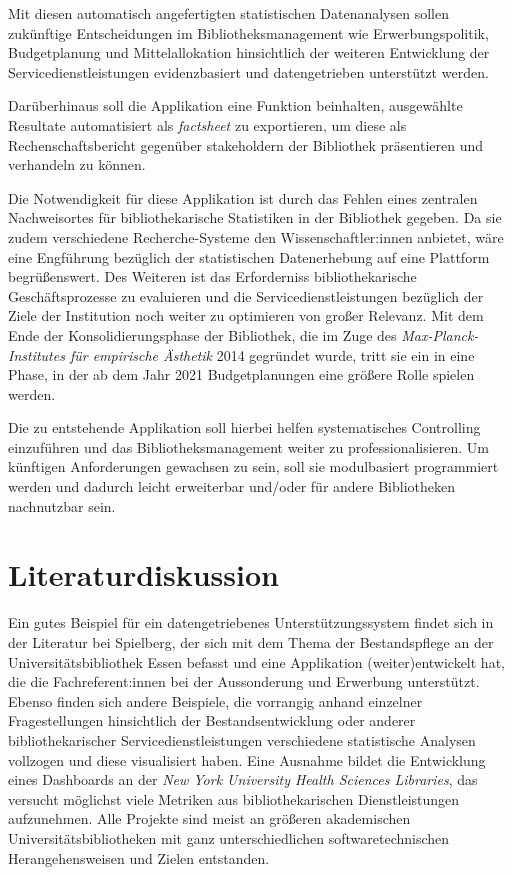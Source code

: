\documentclass[10pt,a4paper,twocolumn,conference]{IEEEtran}
\begin{document}
Mit diesen automatisch angefertigten statistischen Datenanalysen sollen zukünftige
Entscheidungen im Bibliotheksmanagement wie Erwerbungspolitik, Budgetplanung und 
Mittelallokation hinsichtlich der weiteren Entwicklung der 
Servicedienstleistungen evidenzbasiert und datengetrieben unterstützt werden.

Darüberhinaus soll die Applikation  eine Funktion beinhalten, ausgewählte
Resultate automatisiert als \textit{factsheet} zu exportieren, um diese 
als Rechenschaftsbericht gegenüber stakeholdern der Bibliothek präsentieren und
verhandeln zu können.

Die Notwendigkeit für diese Applikation ist durch das
Fehlen eines zentralen Nachweisortes für bibliothekarische
Statistiken in der Bibliothek gegeben. Da sie zudem verschiedene Recherche-Systeme den
Wissenschaftler:innen anbietet, wäre eine Engführung bezüglich der statistischen
Datenerhebung auf eine Plattform begrüßenswert.
Des Weiteren ist das Erforderniss bibliothekarische Geschäftsprozesse zu evaluieren und die
Servicedienstleistungen bezüglich der Ziele der Institution noch weiter zu
optimieren von großer Relevanz. Mit dem Ende der Konsolidierungsphase der
Bibliothek, die im Zuge des \textit{Max-Planck-Institutes für empirische
Ästhetik} 2014 gegründet wurde, tritt sie ein in eine Phase, in der ab dem Jahr
2021 Budgetplanungen eine größere Rolle spielen werden. 

Die zu entstehende Applikation soll hierbei helfen systematisches Controlling einzuführen und das
Bibliotheksmanagement weiter zu professionalisieren.
Um künftigen Anforderungen gewachsen zu sein, soll sie 
modulbasiert programmiert werden und dadurch leicht erweiterbar und/oder für 
andere Bibliotheken nachnutzbar sein.


\section{Literaturdiskussion}
Ein gutes Beispiel für ein datengetriebenes Unterstützungssystem findet sich in
der Literatur bei Spielberg, der sich mit dem Thema der Bestandspflege an der
Universitätsbibliothek Essen befasst und eine Applikation (weiter)entwickelt hat, die
die Fachreferent:innen bei der Aussonderung und Erwerbung
unterstützt.\cite{RN48}
Ebenso finden sich andere Beispiele, die vorrangig anhand einzelner
Fragestellungen hinsichtlich der Bestandsentwicklung\cite{RN28} oder anderer
bibliothekarischer Servicedienstleistungen\cite{RN43,RN41,RN45} verschiedene statistische Analysen
vollzogen und diese visualisiert haben.
Eine Ausnahme bildet die Entwicklung eines Dashboards an der \textit{New York
University Health Sciences Libraries}, das versucht möglichst viele Metriken
aus bibliothekarischen Dienstleistungen aufzunehmen.\cite{RN34}
Alle Projekte sind meist an größeren akademischen
Universitätsbibliotheken mit ganz unterschiedlichen softwaretechnischen
Herangehensweisen\cite{RN31,RN42} und Zielen\cite{RN1} entstanden.
\end{document}
